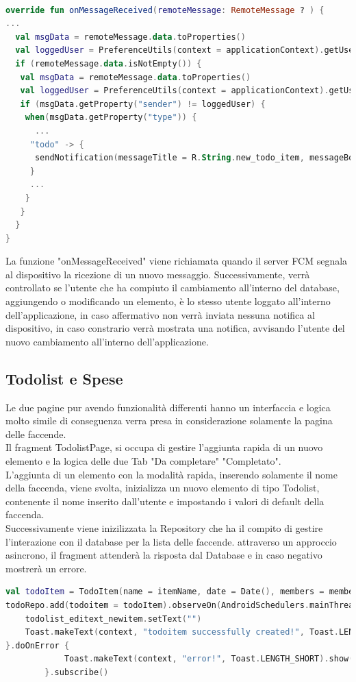 \begin{lstlisting}[language=kotlin,caption={Metodo onMessageReceived}]

override fun onMessageReceived(remoteMessage: RemoteMessage ? ) {
...
  val msgData = remoteMessage.data.toProperties()
  val loggedUser = PreferenceUtils(context = applicationContext).getUserUID()
  if (remoteMessage.data.isNotEmpty()) {
   val msgData = remoteMessage.data.toProperties()
   val loggedUser = PreferenceUtils(context = applicationContext).getUserUID()
   if (msgData.getProperty("sender") != loggedUser) {
    when(msgData.getProperty("type")) {
      ...
     "todo" -> {
      sendNotification(messageTitle = R.String.new_todo_item, messageBody = msgData.getProperty("name"))
     }
     ...
    }
   }
  }
}
\end{lstlisting}
La funzione "onMessageReceived" viene richiamata quando il server FCM segnala al dispositivo la ricezione di un nuovo messaggio. Successivamente, verrà controllato se l'utente che ha compiuto il cambiamento all'interno del database, aggiungendo o modificando un elemento, è lo stesso utente loggato all'interno dell'applicazione, in caso affermativo non verrà inviata nessuna notifica al dispositivo, in caso constrario verrà mostrata una notifica, avvisando l'utente del nuovo cambiamento all'interno dell'applicazione.

\subsection{Todolist e Spese}
Le due pagine pur avendo funzionalità differenti hanno un interfaccia e logica molto simile di conseguenza verra presa in considerazione solamente la pagina delle faccende.\\
Il fragment TodolistPage, si occupa di gestire l'aggiunta rapida di un nuovo elemento e la logica delle due Tab "Da completare" "Completato".\\
L'aggiunta di un elemento con la modalità rapida, inserendo solamente il nome della faccenda, viene svolta, inizializza un nuovo elemento di tipo Todolist, contenente il nome inserito dall'utente e impostando i valori di default della faccenda.\\ Successivamente viene inizilizzata la Repository che ha il compito di gestire l'interazione con il database per la lista delle faccende. attraverso un approccio asincrono, il fragment attenderà la risposta dal Database e in caso negativo mostrerà un errore.

\begin{lstlisting}[language=kotlin,caption={Aggiunta elemento Todolist}]
val todoItem = TodoItem(name = itemName, date = Date(), members = members, created_by = userUID)
todoRepo.add(todoitem = todoItem).observeOn(AndroidSchedulers.mainThread()).subscribeOn(Schedulers.io()).doOnComplete {
    todolist_editext_newitem.setText("")
    Toast.makeText(context, "todoitem successfully created!", Toast.LENGTH_SHORT).show()
}.doOnError {
            Toast.makeText(context, "error!", Toast.LENGTH_SHORT).show()
        }.subscribe()
\end{lstlisting}

